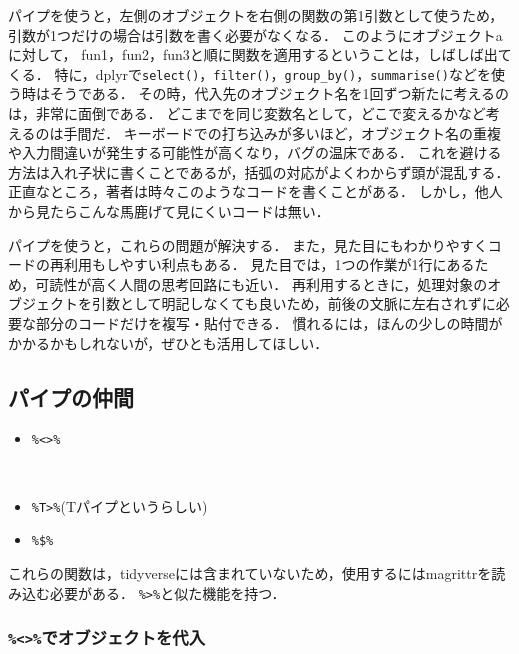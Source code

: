 \documentclass[
]{article}
\providecommand{\tightlist}{%
  \setlength{\itemsep}{0pt}\setlength{\parskip}{0pt}}
\begin{document}
パイプを使うと，左側のオブジェクトを右側の関数の第1引数として使うため，引数が1つだけの場合は引数を書く必要がなくなる．
このようにオブジェクトaに対して， fun1，fun2，fun3と順に関数を適用するということは，しばしば出てくる．
特に，dplyrで\texttt{select()}，\texttt{filter()}，\texttt{group\_by()}，\texttt{summarise()}などを使う時はそうである．
その時，代入先のオブジェクト名を1回ずつ新たに考えるのは，非常に面倒である．
どこまでを同じ変数名として，どこで変えるかなど考えるのは手間だ．
キーボードでの打ち込みが多いほど，オブジェクト名の重複や入力間違いが発生する可能性が高くなり，バグの温床である．
これを避ける方法は入れ子状に書くことであるが，括弧の対応がよくわからず頭が混乱する．
正直なところ，著者は時々このようなコードを書くことがある．
しかし，他人から見たらこんな馬鹿げて見にくいコードは無い．

パイプを使うと，これらの問題が解決する．
また，見た目にもわかりやすくコードの再利用もしやすい利点もある．
見た目では，1つの作業が1行にあるため，可読性が高く人間の思考回路にも近い．
再利用するときに，処理対象のオブジェクトを引数として明記しなくても良いため，前後の文脈に左右されずに必要な部分のコードだけを複写・貼付できる．
慣れるには，ほんの少しの時間がかかるかもしれないが，ぜひとも活用してほしい．

\hypertarget{ux30d1ux30a4ux30d7ux306eux4ef2ux9593}{%
\subsection{パイプの仲間}\label{ux30d1ux30a4ux30d7ux306eux4ef2ux9593}}

\begin{itemize}
\tightlist
\item
  \texttt{\%\textless{}\textgreater{}\%}\strut \\
\item
  \texttt{\%T\textgreater{}\%}(Tパイプというらしい)\\
\item
  \texttt{\%\$\%}
\end{itemize}

これらの関数は，tidyverseには含まれていないため，使用するにはmagrittrを読み込む必要がある．
\texttt{\%\textgreater{}\%}と似た機能を持つ．

\hypertarget{ux3067ux30aaux30d6ux30b8ux30a7ux30afux30c8ux3092ux4ee3ux5165}{%
\subsubsection{\texorpdfstring{\texttt{\%\textless{}\textgreater{}\%}でオブジェクトを代入}{\%\textless\textgreater\%でオブジェクトを代入}}\label{ux3067ux30aaux30d6ux30b8ux30a7ux30afux30c8ux3092ux4ee3ux5165}}
\end{document}
